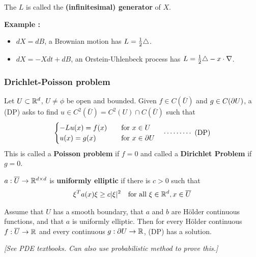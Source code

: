 \documentclass[12pt,a4paper]{article}
\renewenvironment{i}
{\begin{itemize} 
	}%
	{\end{itemize}
}
\begin{document}
 The $L$ is called the \textbf{(infinitesimal) generator} of $X$.
\s

\textbf{Example :}
\begin{i}
\item $dX =dB$, a Brownian motion has $L =\frac{1}{2}\triangle$.
\item $dX = -Xdt + dB$, an Orstein-Uhlenbeck process has $L = \frac{1}{2} \triangle - x\cdot \nabla$.
\end{i}
\s

\subsubsection*{Drichlet-Poisson problem}
Let $U\subset \mathbb{R}^d$, $U\neq \phi$ be open and bounded. Given $f\in C(\bar{U})$ and $g\in C(\partial U)$, a (DP) asks to find $u\in C^2(\bar{U})= C^2(U) \cap C(\bar{U})$ such that
\begin{align*}
\begin{cases}
-Lu(x) = f(x) \quad & \text{for }x\in U \\
u(x) = g(x) \quad & \text{for } x\in \partial U
\end{cases} \quad \cdots\cdots\cdots\,\,(\text{DP})
\end{align*}
This is called a \textbf{Poisson problem} if $f=0$ and called a \textbf{Dirichlet Problem} if $g=0$.
\s

 $a: \overline{U} \rightarrow \mathbb{R}^{d\times d}$ is \textbf{uniformly elliptic} if there is $c>0$ such that
\begin{align*}
\xi^T a(x) \xi \geq c|\xi|^2 \quad \text{for all } \xi \in \mathbb{R}^d, x\in \overline{U}
\end{align*}
\s

\thm Assume that $U$ has a smooth boundary, that $a$ and $b$ are H\"older continuous functions, and that $a$ is uniformly elliptic. Then for every H\"older continuous $f: \overline{U} \rightarrow \mathbb{R}$ and every continuous $g: \partial U \rightarrow \mathbb{R}$, (DP)  has a solution.

\emph{[See PDE textbooks. Can also use probabilistic method to prove this.]}
\s
\end{document}
